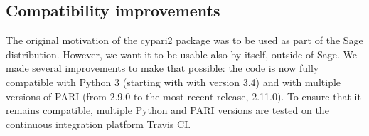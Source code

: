 \documentclass{deliverablereport}
\begin{document}
\subsection{Compatibility improvements}

The original motivation of the cypari2 package
was to be used as part of the Sage distribution.
However, we want it to be usable also by itself, outside of Sage.
We made several improvements to make that possible:
the code is now fully compatible with Python 3 (starting with with version 3.4)
and with multiple versions of PARI (from 2.9.0 to the most recent release, 2.11.0).
To ensure that it remains compatible, multiple Python and PARI
versions are tested on the continuous integration platform Travis CI.
\end{document}
